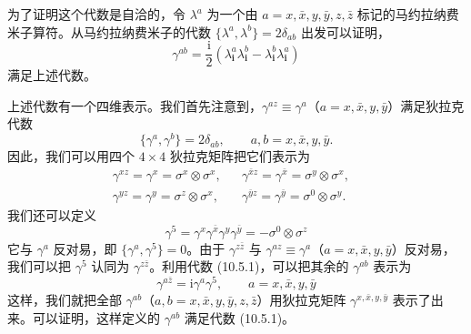 为了证明这个代数是自洽的，令 $\lambda^{a}$ 为一个由 $a=x,\bar{x},y,\bar{y},z,\bar{z}$ 标记的马约拉纳费米子算符。从马约拉纳费米子的代数 $\{\lambda^{a},\lambda^{b}\}=2\delta_{ab}$ 出发可以证明，
\begin{equation*}
\gamma^{ab}=\frac{\mathrm{i}}{2}\left(\lambda_{\pmb{i}}^{a}\lambda_{\pmb{i}}^{b}-\lambda_{\pmb{i}}^{b}\lambda_{\pmb{i}}^{a}\right)
\end{equation*}
满足上述代数。

上述代数有一个四维表示。我们首先注意到，$\gamma^{az}\equiv\gamma^{a}$（$a=x,\bar{x},y,\bar{y}$）满足狄拉克代数
\begin{equation*}
\{\gamma^{a},\gamma^{b}\}=2\delta_{ab}, \qquad a,b=x,\bar{x},y,\bar{y}. \tag{10.5.2}
\end{equation*}
因此，我们可以用四个 $4\times4$ 狄拉克矩阵把它们表示为
\begin{align*}
\gamma^{xz}=\gamma^{x}=\sigma^{x}\otimes\sigma^{x}, & & \gamma^{\bar{x}z}=\gamma^{\bar{x}}=\sigma^{y}\otimes\sigma^{x}, &\\
\gamma^{yz}=\gamma^{y}=\sigma^{z}\otimes\sigma^{x}, & & \gamma^{\bar{y}z}=\gamma^{\bar{y}}=\sigma^{0}\otimes\sigma^{y}. & \tag{10.5.3}
\end{align*}
我们还可以定义
\begin{equation*}
\gamma^{5}=\gamma^{x}\gamma^{\bar{x}}\gamma^{y}\gamma^{\bar{y}}=-\sigma^{0}\otimes\sigma^{z}
\end{equation*}
它与 $\gamma^{a}$ 反对易，即 $\{\gamma^{a},\gamma^{5}\}=0$。由于 $\gamma^{z\bar{z}}$ 与 $\gamma^{az}\equiv\gamma^{a}$（$a=x,\bar{x},y,\bar{y}$）反对易，我们可以把 $\gamma^{5}$ 认同为 $\gamma^{z\bar{z}}$。利用代数 (10.5.1)，可以把其余的 $\gamma^{ab}$ 表示为
\begin{equation*}
\gamma^{a\bar{z}}=\mathrm{i}\gamma^{a}\gamma^{5}, \qquad a=x,\bar{x},y,\bar{y}
\end{equation*}
这样，我们就把全部 $\gamma^{ab}$（$a,b=x,\bar{x},y,\bar{y},z,\bar{z}$）用狄拉克矩阵 $\gamma^{x,\bar{x},y,\bar{y}}$ 表示了出来。可以证明，这样定义的 $\gamma^{ab}$ 满足代数 (10.5.1)。

